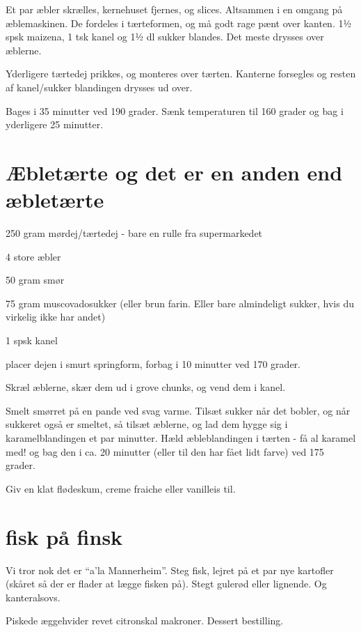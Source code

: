 \documentclass[
]{book}
\begin{document}
Et par æbler skrælles, kernehuset fjernes, og slices. Altsammen i en omgang på æblemaskinen. De fordeles i tærteformen, og må godt rage pænt over kanten. 1½ spsk maizena, 1 tsk kanel og 1½ dl sukker blandes. Det meste drysses over æblerne.

Yderligere tærtedej prikkes, og monteres over tærten. Kanterne forsegles og resten af kanel/sukker blandingen drysses ud over.

Bages i 35 minutter ved 190 grader. Sænk temperaturen til 160 grader og bag i yderligere 25 minutter.

\hypertarget{uxe6bletuxe6rte-og-det-er-en-anden-end-uxe6bletuxe6rte}{%
\section{Æbletærte og det er en anden end æbletærte}\label{uxe6bletuxe6rte-og-det-er-en-anden-end-uxe6bletuxe6rte}}

250 gram mørdej/tærtedej - bare en rulle fra supermarkedet

4 store æbler

50 gram smør

75 gram muscovadosukker (eller brun farin. Eller bare almindeligt sukker, hvis du virkelig ikke har andet)

1 spsk kanel

placer dejen i smurt springform, forbag i 10 minutter ved 170 grader.

Skræl æblerne, skær dem ud i grove chunks, og vend dem i kanel.

Smelt smørret på en pande ved svag varme. Tilsæt sukker når det bobler, og når sukkeret også er smeltet, så tilsæt æblerne, og lad dem hygge sig i karamelblandingen et par minutter. Hæld æbleblandingen i tærten - få al karamel med! og bag den i ca. 20 minutter (eller til den har fået lidt farve) ved 175 grader.

Giv en klat flødeskum, creme fraiche eller vanilleis til.

\hypertarget{fisk-puxe5-finsk}{%
\section{fisk på finsk}\label{fisk-puxe5-finsk}}

Vi tror nok det er ``a'la Mannerheim''. Steg fisk, lejret på et par nye kartofler (skåret så der er flader at lægge fisken på). Stegt gulerød eller lignende. Og kanteralsovs.

Piskede æggehvider revet citronskal makroner. Dessert bestilling.
\end{document}
